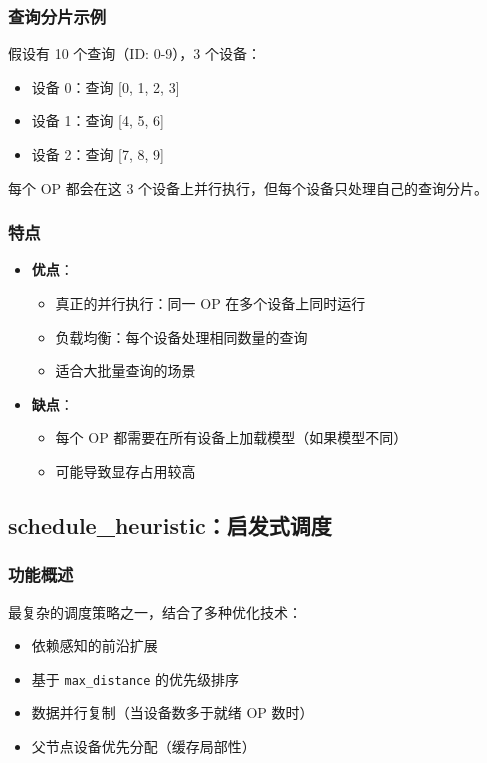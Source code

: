 \documentclass[12pt,a4paper]{article}
\begin{document}
\subsubsection{查询分片示例}

假设有 10 个查询（ID: 0-9），3 个设备：

\begin{itemize}
    \item 设备 0：查询 [0, 1, 2, 3]
    \item 设备 1：查询 [4, 5, 6]
    \item 设备 2：查询 [7, 8, 9]
\end{itemize}

每个 OP 都会在这 3 个设备上并行执行，但每个设备只处理自己的查询分片。

\subsubsection{特点}

\begin{itemize}
    \item \textbf{优点}：
    \begin{itemize}
        \item 真正的并行执行：同一 OP 在多个设备上同时运行
        \item 负载均衡：每个设备处理相同数量的查询
        \item 适合大批量查询的场景
    \end{itemize}
    \item \textbf{缺点}：
    \begin{itemize}
        \item 每个 OP 都需要在所有设备上加载模型（如果模型不同）
        \item 可能导致显存占用较高
    \end{itemize}
\end{itemize}

\subsection{schedule\_heuristic：启发式调度}

\subsubsection{功能概述}

最复杂的调度策略之一，结合了多种优化技术：
\begin{itemize}
    \item 依赖感知的前沿扩展
    \item 基于 \texttt{max\_distance} 的优先级排序
    \item 数据并行复制（当设备数多于就绪 OP 数时）
    \item 父节点设备优先分配（缓存局部性）
\end{itemize}
\end{document}
